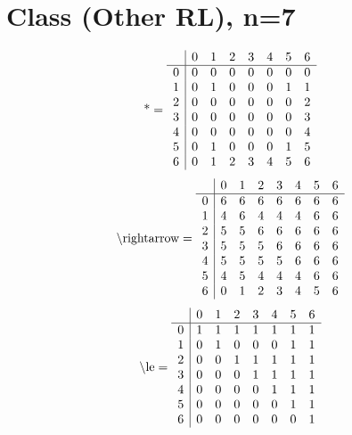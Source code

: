 \documentclass[11pt]{article}
\begin{document}
\section{Class (Other RL), n=7}
\[\text{*} = 
\begin{array}{r | r r r r r r r}
 & 0 & 1 & 2 & 3 & 4 & 5 & 6 \\ \hline
0 & 0 & 0 & 0 & 0 & 0 & 0 & 0 \\
1 & 0 & 1 & 0 & 0 & 0 & 1 & 1 \\
2 & 0 & 0 & 0 & 0 & 0 & 0 & 2 \\
3 & 0 & 0 & 0 & 0 & 0 & 0 & 3 \\
4 & 0 & 0 & 0 & 0 & 0 & 0 & 4 \\
5 & 0 & 1 & 0 & 0 & 0 & 1 & 5 \\
6 & 0 & 1 & 2 & 3 & 4 & 5 & 6 \\
\end{array}
\]
\[\text{\textbackslash rightarrow} = 
\begin{array}{r | r r r r r r r}
 & 0 & 1 & 2 & 3 & 4 & 5 & 6 \\ \hline
0 & 6 & 6 & 6 & 6 & 6 & 6 & 6 \\
1 & 4 & 6 & 4 & 4 & 4 & 6 & 6 \\
2 & 5 & 5 & 6 & 6 & 6 & 6 & 6 \\
3 & 5 & 5 & 5 & 6 & 6 & 6 & 6 \\
4 & 5 & 5 & 5 & 5 & 6 & 6 & 6 \\
5 & 4 & 5 & 4 & 4 & 4 & 6 & 6 \\
6 & 0 & 1 & 2 & 3 & 4 & 5 & 6 \\
\end{array}
\]
\[\text{\textbackslash le} = 
\begin{array}{r | r r r r r r r}
 & 0 & 1 & 2 & 3 & 4 & 5 & 6 \\ \hline
0 & 1 & 1 & 1 & 1 & 1 & 1 & 1 \\
1 & 0 & 1 & 0 & 0 & 0 & 1 & 1 \\
2 & 0 & 0 & 1 & 1 & 1 & 1 & 1 \\
3 & 0 & 0 & 0 & 1 & 1 & 1 & 1 \\
4 & 0 & 0 & 0 & 0 & 1 & 1 & 1 \\
5 & 0 & 0 & 0 & 0 & 0 & 1 & 1 \\
6 & 0 & 0 & 0 & 0 & 0 & 0 & 1 \\
\end{array}
\]
\end{document}
